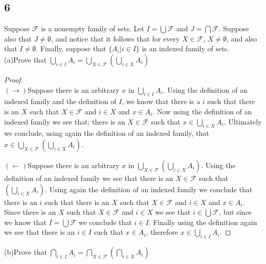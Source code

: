 \documentclass{article}
\begin{document}
\subsection{6}
Suppose $\mathcal{F}$ is a nonempty family of sets. Let $I=\bigcup \mathcal{F}$ and $J=\bigcap \mathcal{F}$. Suppose also that $J \neq \emptyset$, and notice that it follows that for every $X \in \mathcal{F}$, $X \neq \emptyset$, and also that $I \neq \emptyset$. Finally, suppose that $\{A_i | i \in I \}$ is an indexed family of sets. $ $\\
(a)Prove that $\bigcup_{i\in I}A_i=\bigcup_{X\in \mathcal{F}}(\bigcup_{i\in X}A_i)$ \begin{proof}$ $\\

$(\rightarrow)$Suppose there is an arbitrary $x$ in $\bigcup_{i \in I} A_i$. Using the definition of an indexed family and the definition of $I$, we know that there is a $i$ such that there is an $X$ such that $X \in \mathcal{F}$ and $i \in X$ and $x \in A_i$. Now using the definition of an indexed family we see that; there is an $X \in \mathcal{F}$ such that $x \in \bigcup_{i \in X}A_i$. Ultimately we conclude, using again the definition of an indexed family,  that $x \in \bigcup_{X\in \mathcal{F}}(\bigcup_{i\in X}A_i)$.

$(\leftarrow)$Suppose there is an arbitrary $x$ in $\bigcup_{X\in \mathcal{F}}(\bigcup_{i\in X}A_i)$. Using the definition of an indexed family we see that there is an $X \in \mathcal{F}$ such that $(\bigcup_{i\in X}A_i)$. Using again the definition of an indexed family we conclude that there is an $i$ such that there is an $X$ such that $X \in \mathcal{F}$ and $i \in X$ and $x \in A_i$. Since there is an $X$ such that $X \in \mathcal{F}$ and $i \in X$ we see that $i \in \bigcup \mathcal{F}$, but since we know that $I = \bigcup \mathcal{F}$ we conclude that $i \in I$. Finally using the definition again we see that there is an $i \in I$ such that $x \in A_i$, therefore $x \in \bigcup_{i \in I} A_i$.
\end{proof}$ $\\
(b)Prove that $\bigcap_{i\in I}A_i=\bigcap_{X\in \mathcal{F}}(\bigcap_{i\in X}A_i)$
\end{document}

